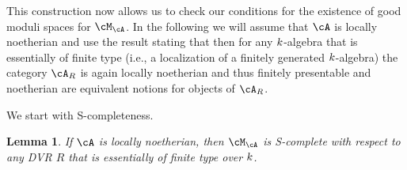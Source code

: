 \documentclass[a4paper]{amsart}
\numberwithin{equation}{section}
\theoremstyle{plain}
\newtheorem{lem}[thm]{Lemma}
\theoremstyle{definition}
\begin{document}
This construction now allows us to check our conditions for the existence of good moduli spaces for $\cM_\cA$. In the following we will assume that $\cA$ is locally noetherian and use the result \cite[Cor.~B6.3]{artin-zhang} stating that then for any $k$-algebra that is essentially of finite type (i.e., a localization of a finitely generated $k$-algebra) the category $\cA_R$ is again locally noetherian and thus finitely presentable and noetherian are equivalent notions for objects of $\cA_R$.

We start with {\textsf{S}}-completeness.

\begin{lem} \label{L:abelian_S_complete}
	If $\cA$ is locally noetherian, then $\cM_\cA$ is  {\textsf{S}}-complete with respect to any DVR $R$ that is essentially of finite type over ${k}$.
\end{lem}
\end{document}
